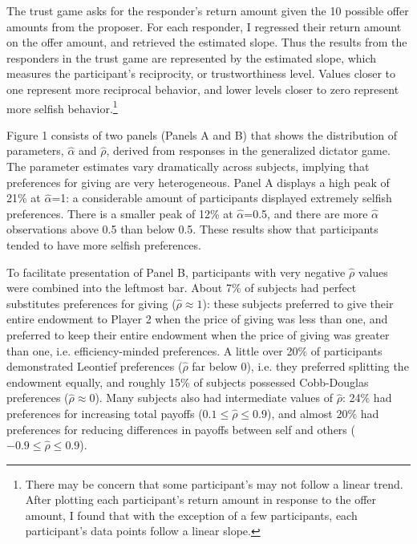 \documentclass[12pt]{article}
\begin{document}
The trust game asks for the responder\rq s return amount given the 10 possible offer amounts from the proposer. For each responder, I regressed their return amount on the offer amount, and retrieved the estimated slope. Thus the results from the responders in the trust game are represented by the estimated slope, which measures the participant\rq s reciprocity, or trustworthiness level. Values closer to one represent more reciprocal behavior, and lower levels closer to zero represent more selfish behavior.\footnote{There may be concern that some participant\rq s may not follow a linear trend. After plotting each participant\rq s return amount in response to the offer amount, I found that with the exception of a few participants, each participant\rq s data points follow a linear slope.}

Figure 1 consists of two panels (Panels A and B) that shows the distribution of parameters, \(\hat{\alpha}\) and \(\hat{\rho}\), derived from responses in the generalized dictator game.  The parameter estimates vary dramatically across subjects, implying that preferences for giving are very heterogeneous. Panel A displays a high peak of 21\% at \(\hat{\alpha}\)=1: a considerable amount of participants displayed extremely selfish preferences. There is a smaller peak of 12\% at \(\hat{\alpha}\)=0.5, and there are more \(\hat{\alpha}\) observations above 0.5 than below 0.5. These results show that participants tended to have more selfish preferences. 

To facilitate presentation of Panel B, participants with very negative \(\hat{\rho}\) values were combined into the leftmost bar. About 7\% of subjects had perfect substitutes preferences for giving (\(\hat{\rho} \approx 1\)): these subjects preferred to give their entire endowment to Player 2 when the price of giving was less than one, and preferred to keep their entire endowment when the price of giving was greater than one, i.e. efficiency-minded preferences. A little over 20\% of participants demonstrated Leontief preferences (\(\hat{\rho}\) far below 0), i.e. they preferred splitting the endowment equally, and roughly 15\% of subjects possessed Cobb-Douglas preferences (\(\hat{\rho} \approx 0\)). Many subjects also had intermediate values of \(\hat{\rho}\): 24\% had preferences for increasing total payoffs (\(0.1 \leq \hat{\rho} \leq 0.9\)), and almost 20\% had preferences for reducing differences in payoffs between self and others (\(-0.9 \leq \hat{\rho} \leq 0.9\)).
\end{document}
